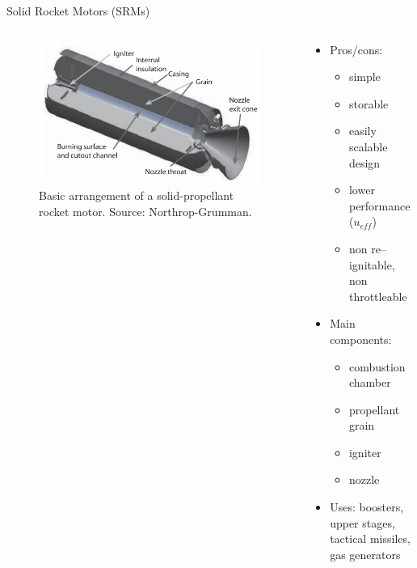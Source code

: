\documentclass[
  ignorenonframetext,
]{beamer}
\providecommand{\tightlist}{%
  \setlength{\itemsep}{0pt}\setlength{\parskip}{0pt}}\usepackage{longtable,booktabs,array}
\begin{document}
\begin{frame}{Solid Rocket Motors (SRMs)}
\protect\hypertarget{solid-rocket-motors-srms}{}
\begin{columns}[T]
\begin{column}{0.5\textwidth}
\begin{figure}

{\centering \includegraphics{figs/fig4.9.png}

}

\caption{Basic arrangement of a solid-propellant rocket motor. Source:
Northrop-Grumman.}

\end{figure}
\end{column}

\begin{column}{0.5\textwidth}
\begin{itemize}
\tightlist
\item
  Pros/cons:

  \begin{itemize}
  \tightlist
  \item
    simple
  \item
    storable
  \item
    easily scalable design
  \item
    lower performance (\(u_{eff}\))
  \item
    non re--ignitable, non throttleable
  \end{itemize}
\item
  Main components:

  \begin{itemize}
  \tightlist
  \item
    combustion chamber
  \item
    propellant grain
  \item
    igniter
  \item
    nozzle
  \end{itemize}
\item
  Uses: boosters, upper stages, tactical missiles, gas generators
\end{itemize}
\end{column}
\end{columns}
\end{frame}
\end{document}
